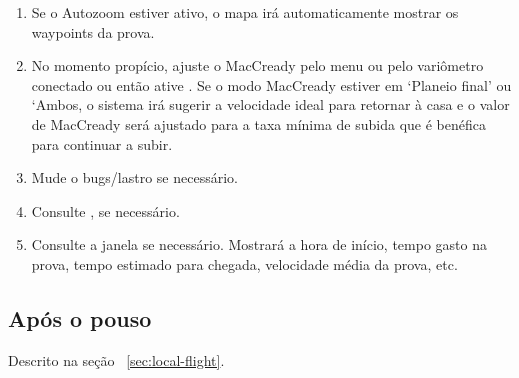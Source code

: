 \begin{enumerate}
\item Se o Autozoom estiver ativo, o mapa irá automaticamente mostrar os waypoints da prova.

\item  No momento propício, ajuste o MacCready pelo menu  ou pelo variômetro conectado ou então ative .
 Se o modo MacCready estiver em ‘Planeio final’ ou ‘Ambos, o sistema irá sugerir a velocidade ideal para retornar à casa e o valor de MacCready será ajustado para a taxa mínima de subida que é benéfica para continuar a subir.  
  
\item  Mude o bugs/lastro se necessário.
\item  Consulte , se necessário. 
\item  Consulte a janela  se necessário.  Mostrará a hora de início, tempo gasto na prova, tempo estimado para chegada, velocidade média da prova, etc. 
\end{enumerate}

\subsection*{Após o pouso}
Descrito na seção ~\ref{sec:local-flight}.

%
%
%
%

